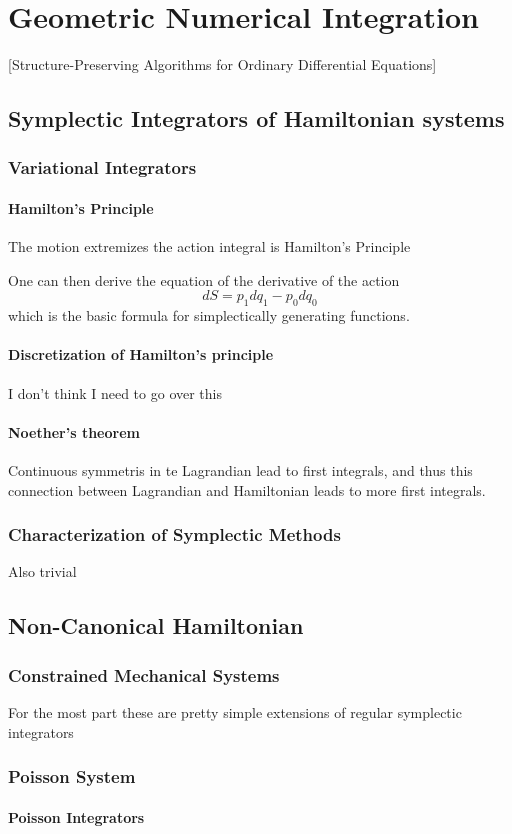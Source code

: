 \chapter{Geometric Numerical Integration}[Structure-Preserving Algorithms for Ordinary Differential Equations]

\section{Symplectic Integrators of Hamiltonian systems}
\subsection{Variational Integrators}
\subsubsection{Hamilton's Principle}
The motion extremizes the action integral is Hamilton's Principle

One can then derive the equation of the derivative of the action
\[
dS = p_1 dq_1 - p_0 dq_0
\]
which is the basic formula for simplectically generating functions.

\subsubsection{Discretization of Hamilton's principle}

I don't think I need to go over this

\subsubsection{Noether's theorem}
Continuous symmetris in te Lagrandian lead to first integrals, and thus this connection between Lagrandian and Hamiltonian leads to more first integrals.

\subsection{Characterization of Symplectic Methods}
Also trivial

\section{Non-Canonical Hamiltonian}

\subsection{Constrained Mechanical Systems}

For the most part these are pretty simple extensions of regular symplectic integrators

\subsection{Poisson System}

\subsubsection{Poisson Integrators}

